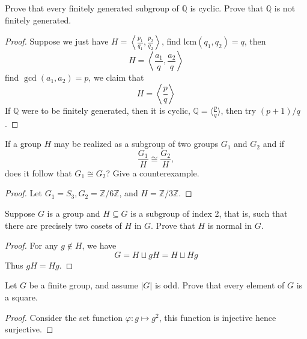 \documentclass[openany]{book}
\newcommand{\Z}{\mathbb{Z}}
\newcommand{\la}{\langle}
\newcommand{\ra}{\rangle}
\newcommand{\Q}{\mathbb{Q}}
\begin{document}
\begin{prob}[6.9]
    Prove that every finitely generated subgroup of $\mathbb{Q}$ is cyclic. Prove that $\mathbb{Q}$ is not finitely generated.
\end{prob}
\begin{proof}
    Suppose we just have $H=\left\la\frac{p_1}{q_1}, \frac{p_2}{q_2}\right\ra$, find $\text{lcm}(q_1,q_2)=q$, then 
    \begin{equation*}
        H=\left\la\frac{a_1}{q},\frac{a_2}{q}\right\ra
    \end{equation*}
    find $\gcd(a_1,a_2)=p$, we claim that 
    \begin{equation*}
        H=\left\la\frac{p}{q}\right\ra
    \end{equation*}
    If $\Q$ were to be finitely generated, then it is cyclic, $\Q=\la\frac{p}{q}\ra$, then try $(p+1)/q$.
\end{proof}

\begin{prob}[8.1]
    If a group \( H \) may be realized as a subgroup of two groups \( G_1 \) and \( G_2 \) and if  
    \[
    \frac{G_1}{H} \cong \frac{G_2}{H},
    \]
    does it follow that \( G_1 \cong G_2 \)? Give a counterexample.
\end{prob}
\begin{proof}
    Let $G_1=S_3, G_2=\Z/6\Z$, and $H=\Z/3\Z$.
\end{proof}

\begin{prob}[8.2]
    Suppose \( G \) is a group and \( H \subseteq G \) is a subgroup of index 2, that is, such that there are precisely two cosets of \( H \) in \( G \). Prove that \( H \) is normal in \( G \).
\end{prob}
\begin{proof}
    For any $g\not\in H$, we have 
    \begin{equation*}
        G=H\sqcup gH=H\sqcup Hg
    \end{equation*}
    Thus $gH=Hg$.
\end{proof}


\begin{prob}[8.13]
    Let \( G \) be a finite group, and assume \(|G|\) is odd. Prove that every element of \( G \) is a square.
\end{prob}
\begin{proof}
    Consider the set function $\varphi:g\mapsto g^2$, this function is injective hence surjective.
\end{proof}
\end{document}
